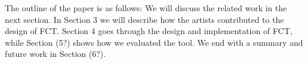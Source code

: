 The outline of the paper is as follows: We will discuss the related work in the next section. In Section 3 we will describe how the artists contributed to the design of FCT. Section 4 goes through the design and implementation of FCT, while Section (5?) shows how we evaluated the tool. We end with a summary and future work in Section (6?).






